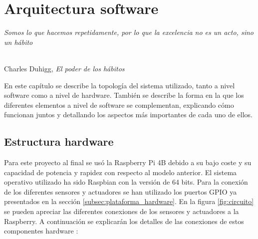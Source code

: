 \chapter{Arquitectura software}
\label{cap:capitulo5}

\begin{flushright}
\begin{minipage}[]{10cm}
\emph{Somos lo que hacemos repetidamente, por lo que la excelencia no es un acto, sino un hábito}\\
\end{minipage}\\

Charles Duhigg, \textit{El poder de los hábitos}\\
\end{flushright}

\vspace{1cm}


En este capítulo se describe la topología del sistema utilizado, tanto a nivel software como a nivel de hardware. También se describe la forma en la que los diferentes elementos a nivel de software se complementan, explicando cómo funcionan juntos y detallando los aspectos más importantes de cada uno de ellos.


\section{Estructura hardware}
\label{sec:estructura_hardware}


Para este proyecto al final se usó la Raspberry Pi 4B debido a su bajo coste y su capacidad de potencia y rapidez con respecto al modelo anterior. El sistema operativo utilizado ha sido Raspbian con la versión de 64 bits. Para la conexión de los diferentes sensores y actuadores se han utilizado los puertos GPIO ya presentados en la sección \ref{subsec:plataforma_hardware}. En la figura \ref{fig:circuito} se pueden apreciar las diferentes conexiones de los sensores y actuadores a la Raspberry. A continuación se explicarán los detalles de las conexiones de estos componentes hardware :


